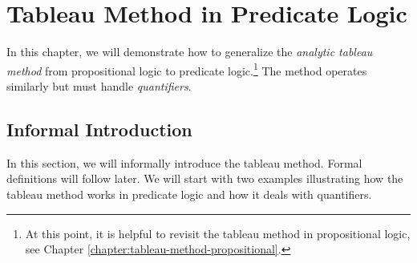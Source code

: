\chapter{Tableau Method in Predicate Logic}

In this chapter, we will demonstrate how to generalize the \emph{analytic tableau method} from propositional logic to predicate logic.\footnote{At this point, it is helpful to revisit the tableau method in propositional logic, see Chapter \ref{chapter:tableau-method-propositional}.} The method operates similarly but must handle \emph{quantifiers}.

\section{Informal Introduction}

In this section, we will informally introduce the tableau method. Formal definitions will follow later. We will start with two examples illustrating how the tableau method works in predicate logic and how it deals with quantifiers.

